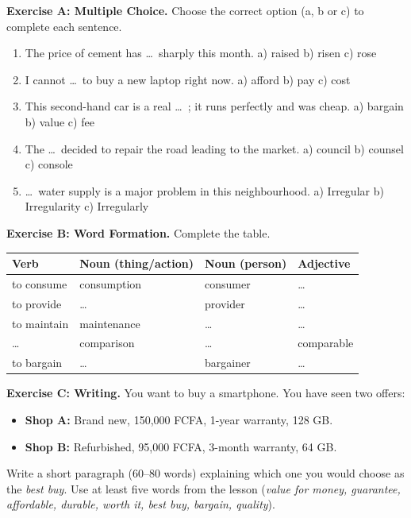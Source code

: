 \documentclass[11pt]{article}
\begin{document}
\begin{exercice}
\textbf{Exercise A: Multiple Choice.} Choose the correct option (a, b or c) to complete each sentence.
\begin{enumerate}
\item The price of cement has \dots\ sharply this month. \quad a) raised \quad b) risen \quad c) rose
\item I cannot \dots\ to buy a new laptop right now. \quad a) afford \quad b) pay \quad c) cost
\item This second-hand car is a real \dots\ ; it runs perfectly and was cheap. \quad a) bargain \quad b) value \quad c) fee
\item The \dots\ decided to repair the road leading to the market. \quad a) council \quad b) counsel \quad c) console
\item \dots\ water supply is a major problem in this neighbourhood. \quad a) Irregular \quad b) Irregularity \quad c) Irregularly
\end{enumerate}

\textbf{Exercise B: Word Formation.} Complete the table.
\begin{center}
\begin{tabular}{|l|l|l|l|}\hline
\rowcolor{popblueL} \textbf{Verb} & \textbf{Noun (thing/action)} & \textbf{Noun (person)} & \textbf{Adjective} \\ \hline
to consume & consumption & consumer & \dots \\ \hline
to provide & \dots & provider & \dots \\ \hline
to maintain & maintenance & \dots & \dots \\ \hline
\dots & comparison & \dots & comparable \\ \hline
to bargain & \dots & bargainer & \dots \\ \hline
\end{tabular}
\end{center}

\textbf{Exercise C: Writing.} You want to buy a smartphone. You have seen two offers:
\begin{itemize}
\item \textbf{Shop A:} Brand new, 150,000 FCFA, 1-year warranty, 128 GB.
\item \textbf{Shop B:} Refurbished, 95,000 FCFA, 3-month warranty, 64 GB.
\end{itemize}
Write a short paragraph (60–80 words) explaining which one you would choose as the \emph{best buy}. Use at least five words from the lesson (\emph{value for money, guarantee, affordable, durable, worth it, best buy, bargain, quality}).
\end{exercice}
\end{document}
